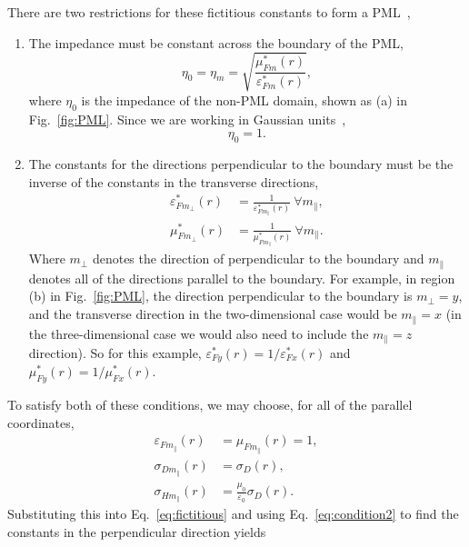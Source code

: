 \documentclass[12pt,twocolumn]{article}
\begin{document}
There are two restrictions for these fictitious constants to form a PML~\cite{Sacks95},
\begin{enumerate}
\item The impedance must be constant across the boundary of the PML,
\begin{equation}
\eta_0=\eta_m=\sqrt{\frac{\mu_{Fm}^*(r)}{\varepsilon_{Fm}^*(r)}},
\end{equation}
where $\eta_0$ is the impedance of the non-PML domain, shown as (a) in Fig.~\ref{fig:PML}. Since we are working in Gaussian units~\cite{Sullivan00,Kitano06},
\begin{equation}
\eta_0=1.
\end{equation}
\item The constants for the directions perpendicular to the boundary must be the inverse of the constants in the transverse directions,
\begin{equation}
\begin{aligned}
\label{eq:condition2}
\varepsilon_{Fm_\perp}^*(r)&=\frac{1}{\varepsilon_{Fm_\parallel}^*(r)}~\forall m_\parallel,\\
\mu_{Fm_\perp}^*(r)&=\frac{1}{\mu_{Fm_\parallel}^*(r)}~\forall m_\parallel.
\end{aligned}
\end{equation}
Where $m_\perp$ denotes the direction of perpendicular to the boundary and $m_\parallel$ denotes all of the directions parallel to the boundary. For example, in region (b) in Fig.~\ref{fig:PML}, the direction perpendicular to the boundary is $m_\perp=y$, and the transverse direction in the two-dimensional case would be $m_\parallel=x$ (in the three-dimensional case we would also need to include the $m_\parallel=z$ direction). So for this example, $\varepsilon_{Fy}^*(r)=1/\varepsilon_{Fx}^*(r)$ and $\mu_{Fy}^*(r)=1/\mu_{Fx}^*(r)$.
\end{enumerate}
To satisfy both of these conditions, we may choose, for all of the parallel coordinates,
\begin{equation}
\begin{aligned}
\varepsilon_{Fm_\parallel}(r)&=\mu_{Fm_\parallel}(r)=1,\\
\sigma_{Dm_\parallel}(r) &= \sigma_{D}(r),\\
\sigma_{Hm_\parallel}(r) &= \frac{\mu_0}{\varepsilon_0}\sigma_{D}(r).
\end{aligned}
\end{equation}
Substituting this into Eq.~\ref{eq:fictitious} and using Eq.~\ref{eq:condition2} to find the constants in the perpendicular direction yields
\end{document}
